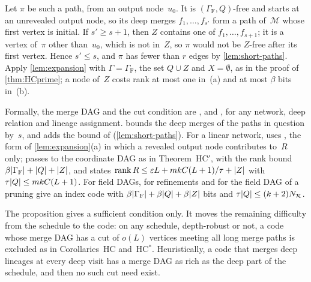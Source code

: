 \begin{outline}
Let $\pi$ be such a path, from an output node~$u_0$. It is $(\Gamma_{\mathrm F},Q)$-free and starts at an unrevealed
output node, so its deep merges $f_1,\dots,f_{s'}$ form a path of~$\mathcal M$ whose first vertex is initial. If
$s'\ge s+1$, then $Z$ contains one of $f_1,\dots,f_{s+1}$; it is a vertex of~$\pi$ other than~$u_0$, which is not in~$Z$,
so $\pi$ would not be $Z$-free after its first vertex. Hence $s'\le s$, and $\pi$ has fewer than $r$ edges by
\cref{lem:short-paths}. Apply \cref{lem:expansion} with $\Gamma=\Gamma_{\mathrm F}$, the set $Q\cup Z$ and $X=\emptyset$,
as in the proof of \cref{thm:HCprime}; a node of~$Z$ costs rank at most one in~(a) and at most $\beta$ bits in~(b).

Formally, the merge DAG and the cut condition are ,  and
, for any network, deep relation and lineage assignment.  bounds the
deep merges of the paths in question by~$s$, and  adds the bound of
 (\cref{lem:short-paths}). For a linear network, 
uses , the form of \cref{lem:expansion}(a) in which a revealed output node
contributes to~$R$ only;  passes to the coordinate DAG as in Theorem~HC$'$, with
the rank bound $\beta\lvert \Gamma_{\mathrm F} \rvert+\lvert Q \rvert+\lvert Z \rvert$, and  states
$\operatorname{rank} R\le\varepsilon L+mkC(L+1)/\tau+\lvert Z \rvert$ with $\tau\lvert Q \rvert\le mkC(L+1)$. For field DAGs, 
for refinements and  for the field DAG of a pruning give an index code with
$\beta\lvert \Gamma_{\mathrm F} \rvert+\beta\lvert Q \rvert+\beta\lvert Z \rvert$ bits and $\tau\lvert Q \rvert\le(k+2)N_{\mathcal R}$.
\end{outline}

The proposition gives a sufficient condition only. It moves the remaining difficulty from the schedule to the code: on
any schedule, depth-robust or not, a code whose merge DAG has a cut of $o(L)$ vertices meeting all long merge paths is
excluded as in Corollaries~HC and~HC$^*$. Heuristically, a code that merges deep lineages at every deep visit has a merge
DAG as rich as the deep part of the schedule, and then no such cut need exist.

